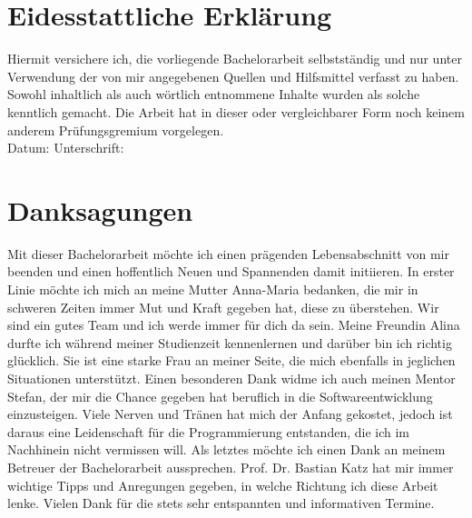 \setcounter{secnumdepth}{0}
\section{Eidesstattliche Erklärung}

Hiermit versichere ich, die vorliegende Bachelorarbeit selbstständig und nur unter Verwendung der von mir angegebenen Quellen und Hilfsmittel verfasst zu haben. Sowohl inhaltlich als auch wörtlich entnommene Inhalte wurden als solche kenntlich gemacht. Die Arbeit hat in dieser oder vergleichbarer Form noch keinem anderem Prüfungsgremium vorgelegen.
\\[1.5cm]
Datum:	\hrulefill\enspace Unterschrift: \hrulefill


\newpage

\section{Danksagungen}
Mit dieser Bachelorarbeit möchte ich einen prägenden Lebensabschnitt von mir beenden und einen hoffentlich Neuen und Spannenden damit initiieren. In erster Linie möchte ich mich an meine Mutter Anna-Maria bedanken, die mir in schweren Zeiten immer Mut und Kraft gegeben hat, diese zu überstehen. Wir sind ein gutes Team und ich werde immer für dich da sein. Meine Freundin Alina durfte ich während meiner Studienzeit kennenlernen und darüber bin ich richtig glücklich. Sie ist eine starke Frau an meiner Seite, die mich ebenfalls in jeglichen Situationen unterstützt. Einen besonderen Dank widme ich auch meinen Mentor Stefan, der mir die Chance gegeben hat beruflich in die Softwareentwicklung einzusteigen. Viele Nerven und Tränen hat mich der Anfang gekostet, jedoch ist daraus eine Leidenschaft für die Programmierung entstanden, die ich im Nachhinein nicht vermissen will. Als letztes möchte ich einen Dank an meinem Betreuer der Bachelorarbeit aussprechen. Prof. Dr. Bastian Katz hat mir immer wichtige Tipps und Anregungen gegeben, in welche Richtung ich diese Arbeit lenke. Vielen Dank für die stets sehr entspannten und informativen Termine.
